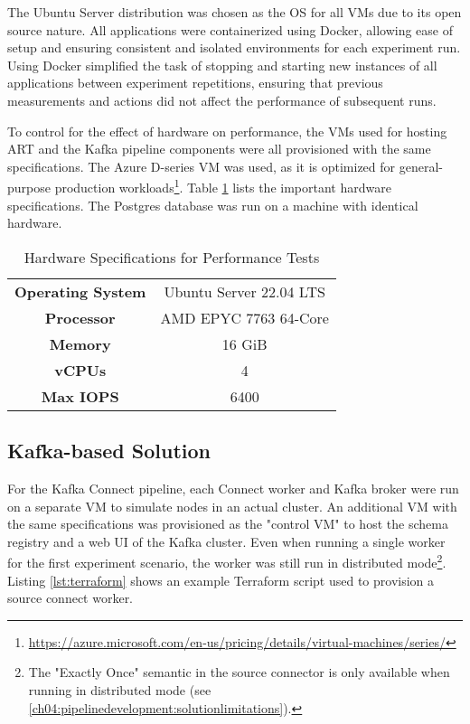 The Ubuntu Server distribution was chosen as the \ac{OS} for all \ac{VM}s due to its open source nature. All applications were containerized using Docker, allowing ease of setup and ensuring consistent and isolated environments for each experiment run. Using Docker simplified the task of stopping and starting new instances of all applications between experiment repetitions, ensuring that previous measurements and actions did not affect the performance of subsequent runs.

To control for the effect of hardware on performance, the \ac{VM}s used for hosting \ac{ART} and the Kafka pipeline components were all provisioned with the same specifications. The Azure D-series \ac{VM} was used, as it is optimized for general-purpose production workloads\footnote{\url{https://azure.microsoft.com/en-us/pricing/details/virtual-machines/series/}}. Table \ref{tab:hardwarespecs} lists the important hardware specifications. The Postgres database was run on a machine with identical hardware.


\begin{table}
    \centering
    \begin{tabular}{|cc|}
        \hline
         \textbf{Operating System} & Ubuntu Server 22.04 LTS \\
         \textbf{Processor} & AMD EPYC 7763 64-Core \\
         \textbf{Memory} & 16 GiB \\
         \textbf{vCPUs} & 4 \\
         \textbf{Max IOPS} & 6400 \\
        \hline
    \end{tabular}
    \caption{Hardware Specifications for Performance Tests}
    \label{tab:hardwarespecs}
\end{table}





\subsection{Kafka-based Solution}
For the Kafka Connect pipeline, each Connect worker and Kafka broker were run on a separate \ac{VM} to simulate nodes in an actual cluster. An additional \ac{VM} with the same specifications was provisioned as the "control \ac{VM}" to host the schema registry and a web UI of the Kafka cluster. Even when running a single worker for the first experiment scenario, the worker was still run in distributed mode\footnote{The "Exactly Once" semantic in the source connector is only available when running in distributed mode (see \ref{ch04:pipelinedevelopment:solutionlimitations}).}. Listing \ref{lst:terraform} shows an example Terraform script used to provision a source connect worker.

